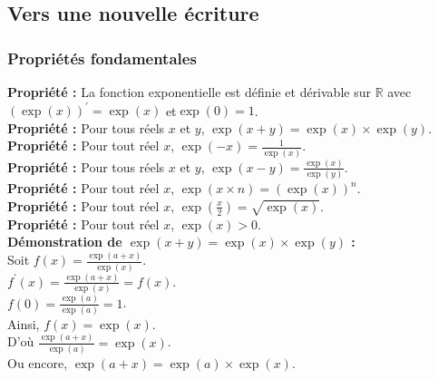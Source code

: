 \documentclass[a4paper,titlepage]{article}
\begin{document}
    \subsection{Vers une nouvelle écriture}
        \subsubsection{Propriétés fondamentales}
            \textbf{Propriété :} La fonction exponentielle est définie et dérivable sur $\mathbb{R}$ avec $\left(\exp\left(x\right)\right)^{\prime}=\exp\left(x\right)$ et\linebreak$\exp\left(0\right)=1$.
            \\
            \textbf{Propriété :} Pour tous réels $x$ et $y$, $\exp\left(x+y\right)=\exp\left(x\right)\times\exp\left(y\right)$.
            \\
            \textbf{Propriété :} Pour tout réel $x$, $\exp\left(-x\right)=\frac{1}{\exp\left(x\right)}$.
            \\
            \textbf{Propriété :} Pour tous réels $x$ et $y$, $\exp\left(x-y\right)=\frac{\exp\left(x\right)}{\exp\left(y\right)}$.
            \\
            \textbf{Propriété :} Pour tout réel $x$, $\exp\left(x\times n\right)=\left(\exp\left(x\right)\right)^{n}$.
            \\
            \textbf{Propriété :} Pour tout réel $x$, $\exp\left(\frac{x}{2}\right)=\sqrt{\exp\left(x\right)}$.
            \\
            \textbf{Propriété :} Pour tout réel $x$, $\exp\left(x\right)>0$.
            \\
            \textbf{\boldmath Démonstration de $\exp\left(x+y\right)=\exp\left(x\right)\times\exp\left(y\right)$ :}
            \\
            Soit $f\left(x\right)=\frac{\exp\left(a+x\right)}{\exp\left(x\right)}$.
            \\
            $f^{\prime}\left(x\right)=\frac{\exp\left(a+x\right)}{\exp\left(x\right)}=f\left(x\right)$.
            \\
            $f\left(0\right)=\frac{\exp\left(a\right)}{\exp\left(a\right)}=1$.
            \\
            Ainsi, $f\left(x\right)=\exp\left(x\right)$.
            \\
            D’où $\frac{\exp\left(a+x\right)}{\exp\left(a\right)}=\exp\left(x\right)$.
            \\
            Ou encore, $\exp\left(a+x\right)=\exp\left(a\right)\times\exp\left(x\right)$.
\end{document}
